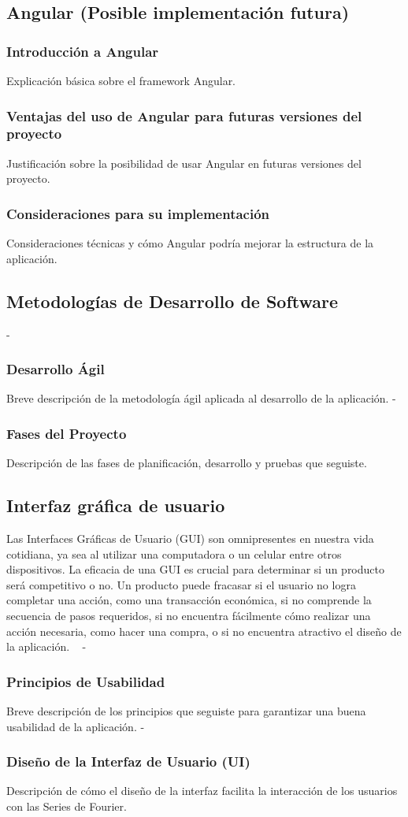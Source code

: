 \subsection{Angular (Posible implementación futura)}
\subsubsection{Introducción a Angular}
Explicación básica sobre el framework Angular.
\subsubsection{Ventajas del uso de Angular para futuras versiones del proyecto}
Justificación sobre la posibilidad de usar Angular en futuras versiones del proyecto.
\subsubsection{Consideraciones para su implementación}
Consideraciones técnicas y cómo Angular podría mejorar la estructura de la aplicación.

\subsection{Metodologías de Desarrollo de Software}
- \subsubsection{Desarrollo Ágil}
Breve descripción de la metodología ágil aplicada al desarrollo de la aplicación.
- \subsubsection{Fases del Proyecto}
Descripción de las fases de planificación, desarrollo y pruebas que seguiste.
\subsection{Interfaz gráfica de usuario}
Las Interfaces Gráficas de Usuario (GUI) son omnipresentes en nuestra vida cotidiana, ya sea al utilizar una computadora o un celular entre otros dispositivos. La eficacia de una GUI es crucial para determinar si un producto será competitivo o no. Un producto puede fracasar si el usuario no logra completar una acción, como una transacción económica, si no comprende la secuencia de pasos requeridos, si no encuentra fácilmente cómo realizar una acción necesaria, como hacer una compra, o si no encuentra atractivo el diseño de la aplicación. ~\cite{interfazAlbornoz}
- \subsubsection{Principios de Usabilidad}
Breve descripción de los principios que seguiste para garantizar una buena usabilidad de la aplicación.
- \subsubsection{Diseño de la Interfaz de Usuario (UI)}
Descripción de cómo el diseño de la interfaz facilita la interacción de los usuarios con las Series de Fourier.

